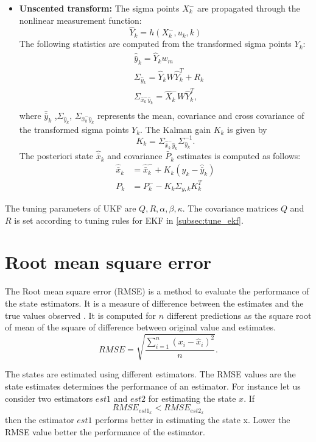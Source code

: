 \begin{itemize}
\begin{itemize}
        \item \textbf{Unscented transform:} The sigma points $X_k^-$ are propagated through the nonlinear measurement function:
        \begin{equation}
        \hat Y_k = h(X_{k}^-,u_k,k) 
        \end{equation}
        The following statistics are computed from the transformed sigma points $Y_k$:
        \begin{equation}
        \begin{split}
        &\hat{\bar y}_k = \hat Y_k w_m \\
        &\Sigma_{\hat y_k} = \hat Y_k W \hat Y_k^T + R_k \\
        &\Sigma_{\hat x_k^- \hat y_k} = \hat X_k^- W \hat Y_k^T, \\
        \end{split}
        \end{equation}
		where $\hat{\bar y}_k$ ,$\Sigma_{\hat y_k}$, $\Sigma_{\hat x_k^- \hat y_k}$ represents the mean, covariance and cross covariance of the transformed sigma points $Y_k$. The Kalman gain $K_k$ is given by
  	\begin{equation}
  		 K_k = \Sigma_{\hat{\bar x}_k^- \hat y_k} \Sigma_{\hat y_k}^{-1}.
  	\end{equation}
  	The posteriori state $\hat{\bar x}_k$ and covariance ${\bar P}_k$ estimates is computed as follows:
        \begin{equation}
        \begin{split}       
        \hat{\bar{x}}_k &= \hat{\bar{x}}_k^- + K_k(y_k - \hat{\bar y}_k)\\
        P_k &= P_k^- - K_k \Sigma_{y,k} K_k^T
        \end{split}
        \end{equation}
    \end{itemize}
\end{itemize}

The tuning parameters of UKF are $Q,R,\alpha,\beta,\kappa$. The covariance matrices $Q$ and $R$ is set according to tuning rules for EKF in \ref{subsec:tune_ekf}.
\section{Root mean square error}
The Root mean square error (RMSE) is a method to evaluate the performance of the state estimators. It is a measure of difference between the estimates and the true values observed \citep{hyn06}. It is computed for $n$ different predictions as the square root of mean of the square of difference between original value and estimates.
\begin{equation}
    \label{eq:rmse}
    RMSE = \sqrt{\frac{\sum_{i=1}^n (x_i - \hat x_i)^2}{n}}.
\end{equation}

The states are estimated using different estimators. The RMSE values are the state estimates determines the performance of an estimator. For instance let us consider two estimators $est1$ and $est2$ for estimating the state $x$. If $$ {RMSE}_{est1_{x}} < {RMSE}_{est2_{x}} $$ then the estimator $est1$ performs better in estimating the state x. Lower the RMSE value better the performance of the estimator.
